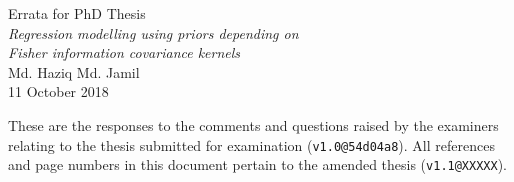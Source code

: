 \documentclass[11pt,openright,twoside]{report}
\begin{document}
\pagestyle{chaptererr}

\begin{center}
  {\Large Errata for PhD Thesis} \\[0.5em]
  \textit{\large Regression modelling using priors depending on} \\[-0.2em]
  \textit{\large Fisher information covariance kernels} \\[0.5em]
  {\large Md. Haziq Md. Jamil} \\
  {\large 11 October 2018}
\end{center}

\vspace{2em}

These are the responses to the comments and questions raised by the examiners relating to the thesis submitted for examination (\verb|v1.0@54d04a8|).
All references and page numbers in this document pertain to the amended thesis (\verb|v1.1@XXXXX|).
\end{document}
